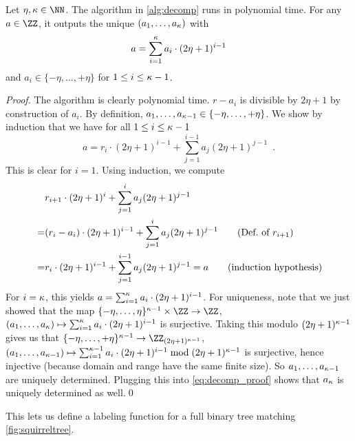 \begin{proposition}
Let $\eta,\limbs\in\NN$. The algorithm in \autoref{alg:decomp} runs in polynomial time. For any $a\in\ZZ$, it outputs the unique $(a_1,\ldots,a_\kappa)$ with
     \begin{equation}\label{eq:decomp_proof}
     a = \sum_{i=1}^{\kappa} a_i \cdot (2\eta+1)^{i-1}
     \end{equation}
and $a_i\in\{-\eta,\ldots,+\eta\}$ for $1\leq i \leq \kappa-1$.
\end{proposition}
\begin{proof}
The algorithm is clearly polynomial time. $r-a_i$ is divisible by $2\eta+1$ by construction of $a_i$. By definition, $a_1,\ldots,a_{\kappa-1}\in\{-\eta,\ldots,+\eta\}$.
We show by induction that we have for all $1\leq i \leq \kappa -1$
\[
a = r_{i}\cdot(2\eta+1)^{i-1} + \sum_{j=1}^{i-1} a_j(2\eta+1)^{j-1}\enspace.
\]
This is clear for $i=1$. Using induction, we compute
\begin{align*}
 {}&r_{i+1}\cdot(2\eta+1)^i + \sum_{j=1}^i a_j(2\eta+1)^{j-1}\\
 {}=&(r_i-a_i)\cdot(2\eta+1)^{i-1} + \sum_{j=1}^i a_j(2\eta+1)^{j-1} \tag{Def.\ of $r_{i+1}$}\\
 {}=&r_{i}\cdot(2\eta+1)^{i-1} + \sum_{j=1}^{i-1} a_j(2\eta+1)^{j-1} = a\tag{induction hypothesis}
\end{align*}
For $i=\kappa$, this yields $a = \sum_{i=1}^{\kappa} a_i \cdot (2\eta+1)^{i-1}$. For uniqueness, note that we just showed that the map $\{-\eta,\ldots,\eta\}^{\limbs-1}\times \ZZ \to \ZZ$, $(a_1,\ldots,a_\kappa)\mapsto \sum_{i=1}^{\kappa} a_i \cdot (2\eta+1)^{i-1}$ is surjective. Taking this modulo $(2\eta+1)^{\kappa-1}$ gives us that $\{-\eta,\ldots,+\eta\}^{\limbs-1}\to \ZZ_{(2\eta+1)^{\limbs-1}}$,
$(a_1,\ldots,a_{\kappa-1})\mapsto \sum_{i=1}^{\kappa-1} a_i \cdot (2\eta+1)^{i-1}\bmod (2\eta+1)^{\kappa-1}$ is surjective, hence injective (because domain and range have the same finite size). So $a_1,\ldots,a_{\kappa-1}$ are uniquely determined. Plugging this into \autoref{eq:decomp_proof} shows that $a_{\kappa}$ is uniquely determined as well.\qed
\end{proof}




This lets us define a labeling function for a full binary tree matching \autoref{fig:squirreltree}.

